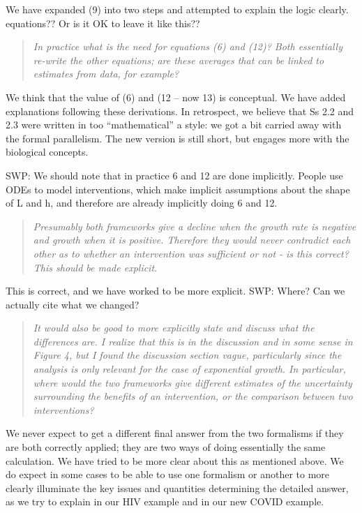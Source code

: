 We have expanded (9) into two steps and attempted to explain the logic
clearly. 
equations?? Or is it OK to leave it like this??

\begin{quote}\sl
In practice what is the need for equations (6) and (12)? Both
essentially re-write the other equations; are these averages that can be
linked to estimates from data, for example?
\end{quote}

We think that the value of (6) and (12 -- now 13) is conceptual. We have
added explanations following these derivations. In retrospect, we
believe that Ss 2.2 and 2.3 were written in too ``mathematical'' a
style: we got a bit carried away with the formal parallelism. The new
version is still short, but engages more with the biological concepts.

SWP: We should note that in practice 6 and 12 are done implicitly.
People use ODEs to model interventions, which make implicit assumptions
about the shape of L and h, and therefore are already implicitly doing 6
and 12.

\begin{quote}\sl
Presumably both frameworks give a decline when the growth rate is
negative and growth when it is positive. Therefore they would never
contradict each other as to whether an intervention was sufficient or
not - is this correct? This should be made explicit.
\end{quote}

This is correct, and we have worked to be more explicit. SWP: Where? Can
we actually cite what we changed?

\begin{quote}\sl
It would also be good to more explicitly state and discuss what the
differences are. I realize that this is in the discussion and in some
sense in Figure 4, but I found the discussion section vague,
particularly since the analysis is only relevant for the case of
exponential growth. In particular, where would the two frameworks give
different estimates of the uncertainty surrounding the benefits of an
intervention, or the comparison between two interventions?
\end{quote}

We never expect to get a different final answer from the two formalisms if they are both correctly applied;
they are two ways of doing essentially the same calculation. 
We have tried to be more clear about this as mentioned above. 
We do expect in some cases to be able to use one formalism or another to more clearly illuminate the key issues and quantities determining the detailed answer, as we try to explain in our HIV example and in our new COVID example.

